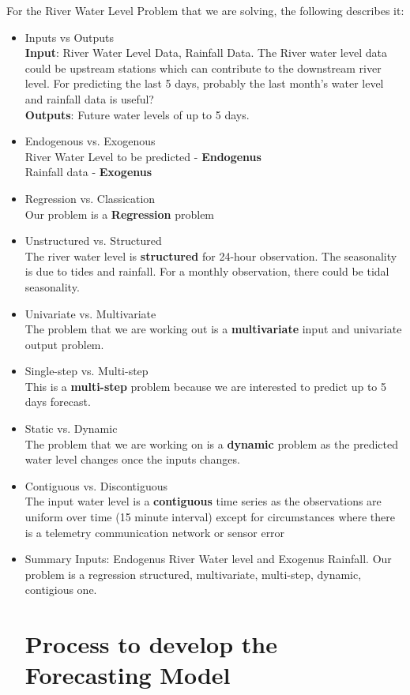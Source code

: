 \documentclass[10pt,a4paper,draft]{article}
\begin{document}
	For the River Water Level Problem that we are solving, the following describes it:
	\begin{itemize}
		\item Inputs vs Outputs
		\\ \textbf{Input}: River Water Level Data, Rainfall Data. The River water level data could be upstream stations which can contribute to the downstream river level. For predicting the last 5 days, probably the last month's water level and rainfall data is useful?
		\\ \textbf{Outputs}: Future water levels of up to 5 days.
		
		\item Endogenous vs. Exogenous
		\\ River Water Level to be predicted - \textbf{Endogenus}
		\\ Rainfall data - \textbf{Exogenus}
		
		\item Regression vs. Classication
		\\ Our problem is a \textbf{Regression} problem
		
		\item Unstructured vs. Structured
		\\ The river water level is \textbf{structured} for 24-hour observation. The seasonality is due to tides and rainfall. For a monthly observation, there could be tidal seasonality.
		
		\item Univariate vs. Multivariate
		\\ The problem that we are working out is a \textbf{multivariate} input and univariate output problem.
		
		\item Single-step vs. Multi-step
		\\ This is a \textbf{multi-step} problem because we are interested to predict up to 5 days forecast.
		
		\item Static vs. Dynamic 
		\\ The problem that we are working on is a \textbf{dynamic} problem as the predicted water level changes once the inputs changes. 
		
		\item Contiguous vs. Discontiguous
		\\ The input water level is a \textbf{contiguous} time series as the observations are uniform over time (15 minute interval) except for circumstances where there is a telemetry communication network or sensor error
		
		\item Summary
		Inputs: Endogenus River Water level and Exogenus Rainfall. Our problem is a regression structured, multivariate, multi-step, dynamic, contigious one. 
		
		\section{Process to develop the Forecasting Model}
		
		
	\end{itemize}



\end{document}

